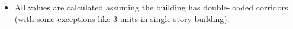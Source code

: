 \begin{itemize}
\item All values are calculated assuming the building has double-loaded corridors (with some exceptions like 3 units in single-story building).
\end{itemize}
